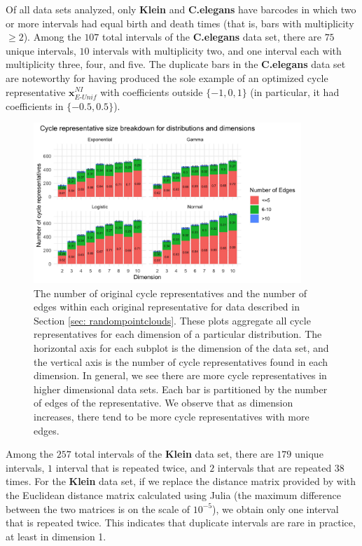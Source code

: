 \documentclass[11pt,onecolumn]{article}
\newcommand{\optimalrep}{\mathbf{x}}
\newcommand{\se}{Section }
\newcommand{\NI}{^{NI}}
\newcommand{\EU}{_{E\text{-}Unif}}
\theoremstyle{plain}
\theoremstyle{definition}
\begin{document}
Of all data sets analyzed, only \textbf{Klein} and \textbf{C.elegans} have barcodes in which two or more intervals had equal birth and death times (that is, bars with multiplicity $\ge 2$). Among the $107$ total intervals of the \textbf{C.elegans} data set, there are $75$ unique intervals, $10$ intervals with multiplicity two, and one interval each with multiplicity three, four, and five. The duplicate bars in the \textbf{C.elegans} data set are noteworthy for having produced the sole example of an optimized cycle representative $\optimalrep\NI\EU$ with coefficients outside $\{-1, 0, 1\}$ (in particular, it had coefficients in $\{-0.5, 0.5\}$). 

 \begin{figure}[]
\begin{center}
\includegraphics[width=0.9\textwidth]{figures/generator_breakdown.jpg} 
\end{center}
\caption{The number of original cycle representatives and the number of edges within each original representative for data described in \se \ref{sec: randompointclouds}. These plots aggregate all cycle representatives for each dimension of a particular distribution. The horizontal axis for each subplot is the dimension of the data set, and the vertical axis is the number of cycle representatives found in each dimension. In general, we see there are more cycle representatives in higher dimensional data sets. Each bar is partitioned by the number of edges of the representative. We observe that as dimension increases, there tend to be more cycle representatives with more edges. 
}\label{fig:gen_num_breakdown}
\end{figure}

Among the $257$ total intervals of the \textbf{Klein} data set, there are $179$ unique intervals, $1$ interval that is repeated twice, and $2$ intervals that are repeated $38$ times. For the \textbf{Klein} data set, if we replace the distance matrix provided by \cite{roadmap2017} with the Euclidean distance matrix calculated using Julia (the maximum difference between the two matrices is on the scale of $10^{-5}$), we obtain only one interval that is repeated twice. This indicates that duplicate intervals are rare in practice, at least in dimension 1. 
\end{document}
